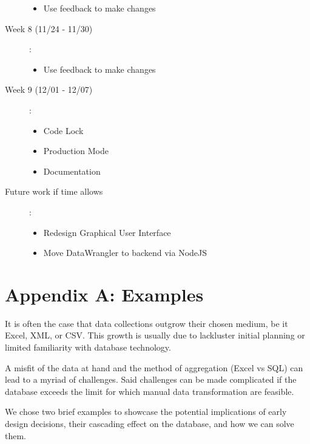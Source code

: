 \documentclass{../sty/acm_proc_article-sp}
\begin{document}
\begin{description}
\begin{itemize}
		\item Use feedback to make changes
	\end{itemize}
\item[Week 8 (11/24 - 11/30)]:
	\begin{itemize}	
		\item Use feedback to make changes
	\end{itemize}
\item[Week 9 (12/01 - 12/07)]:
	\begin{itemize}
		\item Code Lock
		\item Production Mode
		\item Documentation
	\end{itemize}
\item[Future work if time allows]:
	\begin{itemize}
		\item Redesign Graphical User Interface
		\item Move DataWrangler to backend via NodeJS
	\end{itemize}
\end{description}

\section*{Appendix A: Examples}
It is often the case that data collections outgrow their chosen medium, be it Excel, XML, or CSV. This growth is usually due to lackluster initial planning or limited familiarity with database technology.

A misfit of the data at hand and the method of aggregation (Excel vs SQL) can lead to a myriad of challenges. Said challenges can be made complicated if the database exceeds the limit for which manual data transformation are feasible.

We chose two brief examples to showcase the potential implications of early design decisions, their cascading effect on the database, and how we can solve them.
\end{document}
